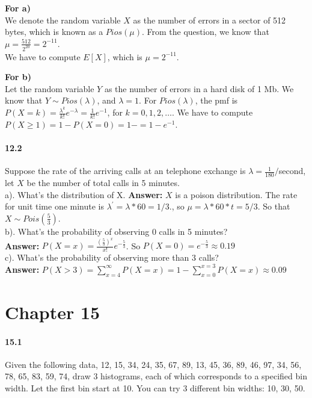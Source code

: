 \documentclass[11pt]{article} %
\begin{document}
{\bf For a)} \\
We denote the random variable $X$ as the number of errors in a sector of 512 bytes, which is known as a $Pios(\mu)$. From the question, we know that $\mu = \frac{512}{2^{20}} = 2^{-11}$.\\
We have to compute $E[X]$, which is $\mu = 2^{-11}$. 

{\bf For b)}\\
Let the random variable $Y$ as the number of errors in a hard disk of 1 Mb. We know that $Y \sim Pios(\lambda)$, and $\lambda = 1$. For $Pios(\lambda)$, the pmf is $P(X=k)=\frac{\lambda^k}{k!}e^{-\lambda} = \frac{1}{k!}e^{-1}$, for $k=0, 1, 2, \ldots$.
We  have to compute $P(X\geq 1) = 1 - P(X=0)  = 1 -  = 1 - e^{-1}$.

\paragraph*{12.2}
Suppose the rate of the arriving calls at an telephone exchange is $\lambda = \frac{1}{180}/$second, let $X$ be the number of total calls in 5 minutes.\\
a). What's the distribution of X.
\textbf{Answer:} $X$ is a poison distribution. The rate for unit time one minute is $\lambda^\prime = \lambda*60 = 1/3.$, so $\mu = \lambda *60 *t = 5/3$. So that $X\sim Pois(\frac{5}{3})$.\\

b). What's the probability of observing 0 calls in 5 minutes?\\
\textbf{Answer:} $P(X=x) = \frac{(\frac{5}{3})^x}{x!}e^{-\frac{5}{3}}$. So $P(X=0) = e^{-\frac{5}{3}} \approx 0.19$\\

c). What's the probability of observing more than 3 calls?\\
\textbf{Answer:} $P(X>3) = \sum^{\infty}_{x=4}P(X=x) = 1-\sum^{x=3}_{x=0}P(X=x) \approx 0.09$ 

\section{Chapter 15}

\paragraph*{15.1} Given the following data, 12, 15, 34, 24, 35, 67, 89, 13, 45, 36, 89, 46, 97, 34, 56, 78, 65, 83, 59, 74, draw 3 histograms, each of which corresponds to a specified bin width. Let the first bin start at 10. You can try 3 different bin widths: 10, 30, 50. 
\end{document}
